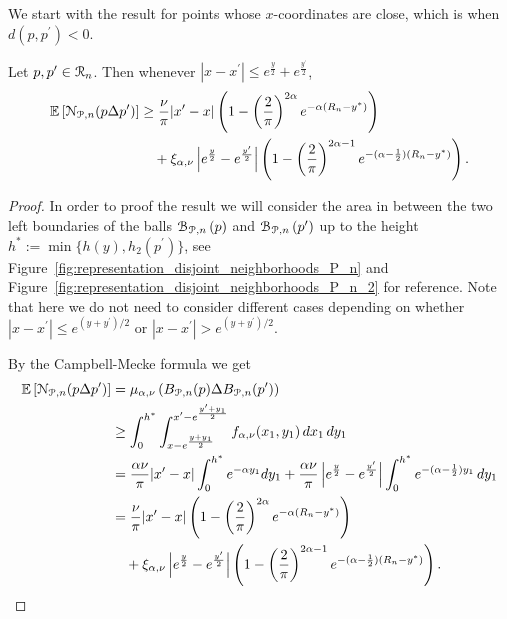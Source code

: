 We start with the result for points whose $x$-coordinates are close, which is when $d(p,p^\prime) < 0$.

\begin{lemma}\label{lem:disjoint_neighbors_P_n}
Let $p, p ^\prime \in {\mathcal R}_n$. Then whenever $|x - x^\prime| \le e^{\frac{y}{2}} + e^{\frac{y^\prime}{2}}$,
\begin{align*}
	\mathbb{E}\left[{\mathcal N}_{{\mathcal P},n}(p \Delta p^\prime)\right]
	&\ge \frac{\nu}{\pi}|x^\prime - x|\left(1 - \left(\frac{2}{\pi}\right)^{2\alpha}e^{-\alpha(R_n - y^\ast)}\right)\\
	&\hspace{10pt}+ \xi_{\alpha, \nu}\left|e^{\frac{y}{2}} - e^{\frac{y^\prime}{2}}\right|
		\left(1 - \left(\frac{2}{\pi}\right)^{2\alpha - 1}e^{-(\alpha - \frac{1}{2})(R_n-y^\ast)}\right).
\end{align*}
\end{lemma}

\begin{proof}
In order to proof the result we will consider the area in between the two left boundaries of the balls ${\mathcal B}_{{\mathcal P},n}\left(p\right)$ and
${\mathcal B}_{{\mathcal P},n}\left(p^\prime\right)$ up to the height $h^\ast := \min\{h(y), h_2(p^\prime)\}$, see Figure~\ref{fig:representation_disjoint_neighborhoods_P_n} and Figure~\ref{fig:representation_disjoint_neighborhoods_P_n_2} for reference. Note that here we do not need to consider different cases depending on whether $|x - x^\prime| \le e^{(y + y^\prime)/2}$ or $|x - x^\prime| > e^{(y + y^\prime)/2}$. 

By the Campbell-Mecke formula we get
\begin{align*}
	\mathbb{E}\left[{\mathcal N}_{{\mathcal P},n}(p \Delta p^\prime)\right] &=	\mu_{\alpha,\nu}\left(B_{{\mathcal P},n}(p) \Delta B_{{\mathcal P},n}(p^\prime)\right)\\
	&\ge \int_0^{h^\ast} \int_{x - e^{\frac{y + y_1}{2}}}^{x^\prime - e^{\frac{y^\prime + y_1}{2}}} f_{\alpha,\nu}(x_1,y_1)
		\, dx_1 \, dy_1 \\
	&= \frac{\alpha \nu}{\pi}|x^\prime - x| \int_{0}^{h^\ast} e^{-\alpha y_1} dy_1
		+ \frac{\alpha \nu}{\pi}\left|e^{\frac{y}{2}} - e^{\frac{y^\prime}{2}}\right| \int_0^{h^\ast} 
		e^{-(\alpha-\frac{1}{2})y_1} \, dy_1\\
	&= \frac{\nu}{\pi}|x^\prime - x|\left(1 - \left(\frac{2}{\pi}\right)^{2\alpha}e^{-\alpha(R_n - y^\ast)}\right)\\
	&\hspace{10pt}+ \xi_{\alpha, \nu}\left|e^{\frac{y}{2}} - e^{\frac{y^\prime}{2}}\right|
		\left(1 - \left(\frac{2}{\pi}\right)^{2\alpha - 1}e^{-(\alpha - \frac{1}{2})(R_n-y^\ast)}\right).
\end{align*}
\end{proof}

